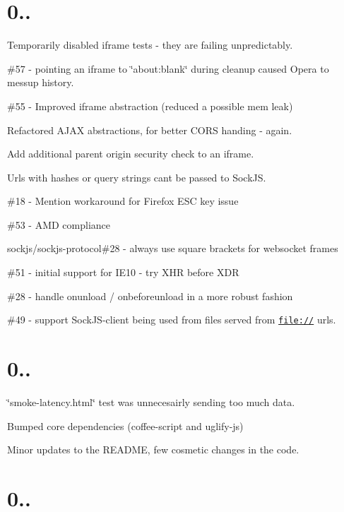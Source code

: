 \section*{0.. }


\begin{DoxyItemize}
\item Temporarily disabled iframe tests -\/ they are failing unpredictably.
\item \#57 -\/ pointing an iframe to \char`\"{}about\+:blank\char`\"{} during cleanup caused Opera to messup history.
\item \#55 -\/ Improved iframe abstraction (reduced a possible mem leak)
\item Refactored A\+J\+AX abstractions, for better C\+O\+RS handing -\/ again.
\item Add additional parent origin security check to an iframe.
\item Urls with hashes or query strings can\textquotesingle{}t be passed to Sock\+JS.
\item \#18 -\/ Mention workaround for Firefox E\+SC key issue
\item \#53 -\/ A\+MD compliance
\item sockjs/sockjs-\/protocol\#28 -\/ always use square brackets for websocket frames
\item \#51 -\/ initial support for I\+E10 -\/ try X\+HR before X\+DR
\item \#28 -\/ handle onunload / onbeforeunload in a more robust fashion
\item \#49 -\/ support Sock\+J\+S-\/client being used from files served from \href{file://}{\tt file\+://} urls.
\end{DoxyItemize}

\section*{0.. }


\begin{DoxyItemize}
\item \char`\"{}smoke-\/latency.\+html\char`\"{} test was unnecesairly sending too much data.
\item Bumped core dependencies (coffee-\/script and uglify-\/js)
\item Minor updates to the R\+E\+A\+D\+ME, few cosmetic changes in the code.
\end{DoxyItemize}

\section*{0.. }


